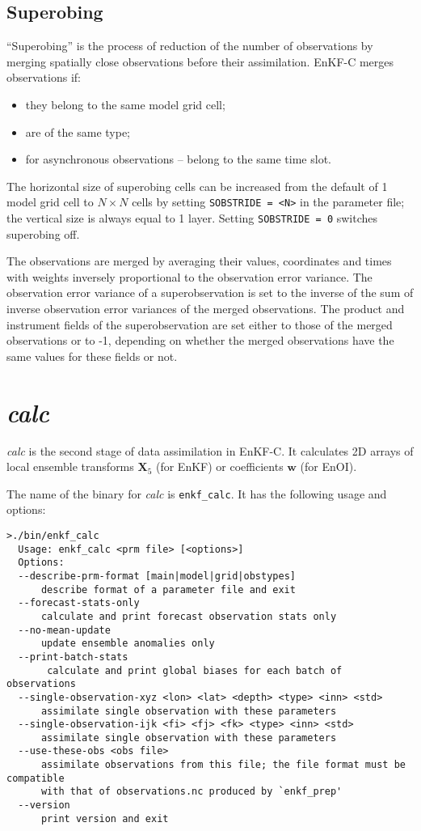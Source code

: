 \documentclass[11pt]{report}
\newcommand{\mb} {\mathbf}
\begin{document}
\subsection{Superobing}

``Superobing'' is the process of reduction of the number of observations by merging spatially close observations before their assimilation.
EnKF-C merges observations if:
\begin{itemize}
\item they belong to the same model grid cell;
\item are of the same type;
\item for asynchronous observations -- belong to the same time slot.
\end{itemize}
The horizontal size of superobing cells can be increased from the default of 1 model grid cell to $N \times N$ cells by setting \verb|SOBSTRIDE = <N>| in the parameter file; the vertical size is always equal to 1 layer.
Setting \verb|SOBSTRIDE = 0| switches superobing off.

The observations are merged by averaging their values, coordinates and times with weights inversely proportional to the observation error variance.
The observation error variance of a superobservation is set to the inverse of the sum of inverse observation error variances of the merged observations.
The product and instrument fields of the superobservation are set either to those of the merged observations or to -1, depending on whether the merged observations have the same values for these fields or not.

\section{\emph{calc}}

\emph{calc} is the second stage of data assimilation in EnKF-C.
It calculates 2D arrays of local ensemble transforms $\mb X_5$ (for EnKF) or coefficients $\mb w$ (for EnOI).

The name of the binary for \emph{calc} is \verb|enkf_calc|.
It has the following usage and options:
\begin{Verbatim}[frame=single,fontsize=\footnotesize]
>./bin/enkf_calc 
  Usage: enkf_calc <prm file> [<options>]
  Options:
  --describe-prm-format [main|model|grid|obstypes]
      describe format of a parameter file and exit
  --forecast-stats-only
      calculate and print forecast observation stats only
  --no-mean-update
      update ensemble anomalies only
  --print-batch-stats
       calculate and print global biases for each batch of observations
  --single-observation-xyz <lon> <lat> <depth> <type> <inn> <std>
      assimilate single observation with these parameters
  --single-observation-ijk <fi> <fj> <fk> <type> <inn> <std>
      assimilate single observation with these parameters
  --use-these-obs <obs file>
      assimilate observations from this file; the file format must be compatible
      with that of observations.nc produced by `enkf_prep'
  --version
      print version and exit
\end{Verbatim}
\end{document}
